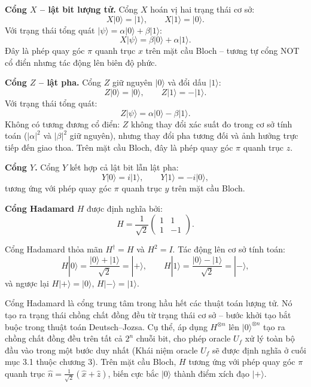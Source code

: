 \begin{example}
\label{ex:pauli-action}
\textbf{Cổng $X$ -- lật bit lượng tử.} Cổng $X$ hoán vị hai trạng thái cơ sở:
$$X|0\rangle = |1\rangle, \qquad X|1\rangle = |0\rangle.$$
Với trạng thái tổng quát $|\psi\rangle = \alpha|0\rangle + \beta|1\rangle$:
$$X|\psi\rangle = \beta|0\rangle + \alpha|1\rangle.$$
Đây là phép quay góc $\pi$ quanh trục $x$ trên mặt cầu Bloch -- tương tự cổng
NOT cổ điển nhưng tác động lên biên độ phức.

\textbf{Cổng $Z$ -- lật pha.} Cổng $Z$ giữ nguyên $|0\rangle$ và đổi dấu $|1\rangle$:
$$Z|0\rangle = |0\rangle, \qquad Z|1\rangle = -|1\rangle.$$
Với trạng thái tổng quát:
$$Z|\psi\rangle = \alpha|0\rangle - \beta|1\rangle.$$
Không có tương đương cổ điển: $Z$ không thay đổi xác suất đo trong cơ sở tính
toán ($|\alpha|^2$ và $|\beta|^2$ giữ nguyên), nhưng thay đổi pha tương đối
và ảnh hưởng trực tiếp đến giao thoa. Trên mặt cầu
Bloch, đây là phép quay góc $\pi$ quanh trục $z$.

\textbf{Cổng $Y$.} Cổng $Y$ kết hợp cả lật bit lẫn lật pha:
$$Y|0\rangle = i|1\rangle, \qquad Y|1\rangle = -i|0\rangle,$$
tương ứng với phép quay góc $\pi$ quanh trục $y$ trên mặt cầu Bloch.
\end{example}

\begin{definition}
\label{def:hadamard}
\textbf{Cổng Hadamard} $H$ được định nghĩa bởi:
$$H = \frac{1}{\sqrt{2}}\begin{pmatrix}1&1\\1&-1\end{pmatrix}.$$
\end{definition}

\begin{proposition}
\label{prop:hadamard}
Cổng Hadamard thỏa mãn $H^\dagger = H$ và $H^2 = I$. Tác động lên cơ sở tính
toán:
$$H|0\rangle = \frac{|0\rangle+|1\rangle}{\sqrt{2}} = |{+}\rangle, \qquad
  H|1\rangle = \frac{|0\rangle-|1\rangle}{\sqrt{2}} = |{-}\rangle,$$
và ngược lại $H|{+}\rangle = |0\rangle$, $H|{-}\rangle = |1\rangle$.
\end{proposition}

\begin{remark}
Cổng Hadamard là cổng trung tâm trong hầu hết các thuật toán lượng tử. Nó tạo ra
trạng thái chồng chất đồng đều từ trạng thái cơ sở -- bước khởi tạo bắt buộc
trong thuật toán Deutsch--Jozsa. Cụ thể, áp dụng $H^{\otimes n}$ lên
$|0\rangle^{\otimes n}$ tạo ra chồng chất đồng đều trên tất cả $2^n$ chuỗi bit, cho phép oracle $U_f$ xử lý toàn bộ đầu
vào trong một bước duy nhất (Khái niệm oracle $U_f$ sẽ được định nghĩa ở cuối mục 3.1 thuộc chương 3). Trên mặt cầu Bloch, $H$ tương ứng với phép quay góc
$\pi$ quanh trục $\hat{n} = \frac{1}{\sqrt{2}}(\hat{x}+\hat{z})$, biến cực bắc
$|0\rangle$ thành điểm xích đạo $|+\rangle$.
\end{remark}

